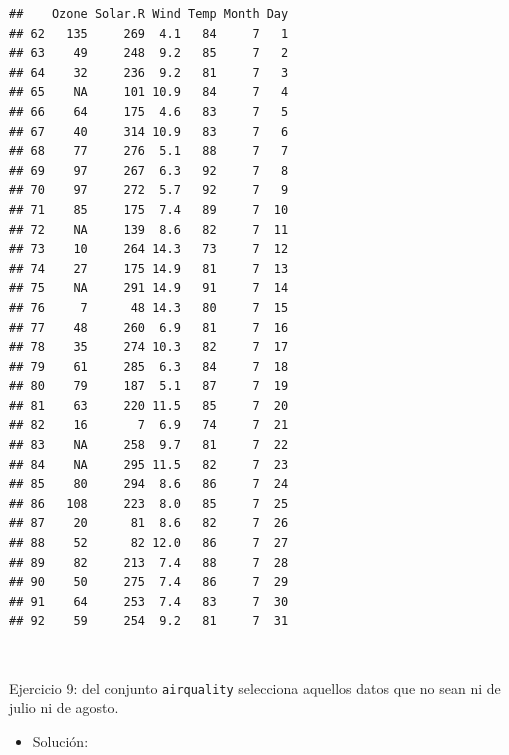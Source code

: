 \documentclass[11pt,]{book}
\newenvironment{Shaded}{\begin{snugshade}}{\end{snugshade}}
\newcommand{\CommentTok}[1]{\textcolor[rgb]{0.37,0.37,0.37}{\textit{#1}}}
\newcommand{\DataTypeTok}[1]{\textcolor[rgb]{0.27,0.27,0.27}{#1}}
\newcommand{\DecValTok}[1]{\textcolor[rgb]{0.06,0.06,0.06}{#1}}
\newcommand{\KeywordTok}[1]{\textcolor[rgb]{0.27,0.27,0.27}{\textbf{#1}}}
\newcommand{\NormalTok}[1]{#1}
\newcommand{\OperatorTok}[1]{\textcolor[rgb]{0.43,0.43,0.43}{\textbf{#1}}}
\newcommand{\StringTok}[1]{\textcolor[rgb]{0.5,0.5,0.5}{#1}}
\providecommand{\tightlist}{%
  \setlength{\itemsep}{0pt}\setlength{\parskip}{0pt}}
\begin{document}
\begin{verbatim}
##    Ozone Solar.R Wind Temp Month Day
## 62   135     269  4.1   84     7   1
## 63    49     248  9.2   85     7   2
## 64    32     236  9.2   81     7   3
## 65    NA     101 10.9   84     7   4
## 66    64     175  4.6   83     7   5
## 67    40     314 10.9   83     7   6
## 68    77     276  5.1   88     7   7
## 69    97     267  6.3   92     7   8
## 70    97     272  5.7   92     7   9
## 71    85     175  7.4   89     7  10
## 72    NA     139  8.6   82     7  11
## 73    10     264 14.3   73     7  12
## 74    27     175 14.9   81     7  13
## 75    NA     291 14.9   91     7  14
## 76     7      48 14.3   80     7  15
## 77    48     260  6.9   81     7  16
## 78    35     274 10.3   82     7  17
## 79    61     285  6.3   84     7  18
## 80    79     187  5.1   87     7  19
## 81    63     220 11.5   85     7  20
## 82    16       7  6.9   74     7  21
## 83    NA     258  9.7   81     7  22
## 84    NA     295 11.5   82     7  23
## 85    80     294  8.6   86     7  24
## 86   108     223  8.0   85     7  25
## 87    20      81  8.6   82     7  26
## 88    52      82 12.0   86     7  27
## 89    82     213  7.4   88     7  28
## 90    50     275  7.4   86     7  29
## 91    64     253  7.4   83     7  30
## 92    59     254  9.2   81     7  31
\end{verbatim}

~

Ejercicio 9: del conjunto \texttt{airquality} selecciona aquellos datos que no sean ni de julio ni de agosto.

\begin{itemize}
\tightlist
\item
  Solución:
\end{itemize}

\begin{Shaded}
\end{Shaded}
\end{document}
